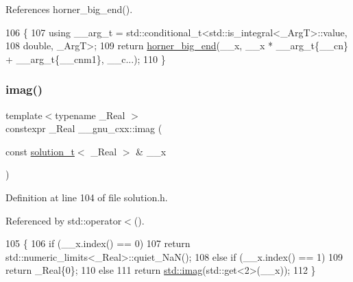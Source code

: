 References horner\+\_\+big\+\_\+end().


\begin{DoxyCode}
106   \{
107     \textcolor{keyword}{using} \_\_arg\_t = std::conditional\_t<std::is\_integral<\_ArgT>::value,
108                                         double, \_ArgT>;
109     \textcolor{keywordflow}{return} \hyperlink{namespace____gnu__cxx_afda9e3a1e351db85a89d4e6434576159}{horner\_big\_end}(\_\_x, \_\_x * \_\_arg\_t\{\_\_cn\} + \_\_arg\_t\{\_\_cnm1\}, \_\_c...);
110   \}
\end{DoxyCode}
\mbox{\label{namespace____gnu__cxx_a685dd0477f8454431bcfb404fa201c57}} 
\subsubsection{\texorpdfstring{imag()}{imag()}}
{\footnotesize\ttfamily template$<$typename \+\_\+\+Real $>$ \\
constexpr \+\_\+\+Real \+\_\+\+\_\+gnu\+\_\+cxx\+::imag (\begin{DoxyParamCaption}\item[{const \hyperlink{namespace____gnu__cxx_ae20ea642de50eb361074c62676b0159c}{solution\+\_\+t}$<$ \+\_\+\+Real $>$ \&}]{\+\_\+\+\_\+x }\end{DoxyParamCaption})}



Definition at line 104 of file solution.\+h.



Referenced by std\+::operator$<$().


\begin{DoxyCode}
105     \{
106       \textcolor{keywordflow}{if} (\_\_x.index() == 0)
107         \textcolor{keywordflow}{return} std::numeric\_limits<\_Real>::quiet\_NaN();
108       \textcolor{keywordflow}{else} \textcolor{keywordflow}{if} (\_\_x.index() == 1)
109         \textcolor{keywordflow}{return} \_Real\{0\};
110       \textcolor{keywordflow}{else}
111         \textcolor{keywordflow}{return} \hyperlink{namespace____gnu__cxx_a685dd0477f8454431bcfb404fa201c57}{std::imag}(std::get<2>(\_\_x));
112     \}
\end{DoxyCode}
\mbox{\label{namespace____gnu__cxx_ac6649e26a3db551b4f945ccfcd3ce0a7}} 
